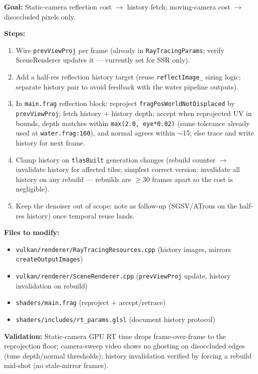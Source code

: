 \documentclass[11pt,a4paper]{article}
\begin{document}
\begin{tcolorbox}[promptbox={Prompt: Temporal Reflection Reuse with Disocclusion Retrace}]
\textbf{Goal:} Static-camera reflection cost $\rightarrow$ history fetch; moving-camera cost $\rightarrow$ disoccluded pixels only.

\textbf{Steps:}
\begin{enumerate}
    \item Wire \texttt{prevViewProj} per frame (already in \texttt{RayTracingParams}; verify SceneRenderer updates it --- currently set for SSR only).
    \item Add a half-res reflection history target (reuse \texttt{reflectImage\_} sizing logic; separate history pair to avoid feedback with the water pipeline outputs).
    \item In \texttt{main.frag} reflection block: reproject \texttt{fragPosWorldNotDisplaced} by \texttt{prevViewProj}; fetch history + history depth; accept when reprojected UV in bounds, depth matches within \texttt{max(2.0, eye*0.02)} (same tolerance already used at \texttt{water.frag:160}), and normal agrees within $\sim$15\textdegree; else trace and write history for next frame.
    \item Clamp history on \texttt{tlasBuilt} generation changes (rebuild counter $\rightarrow$ invalidate history for affected tiles; simplest correct version: invalidate all history on any rebuild --- rebuilds are $\geq$30 frames apart so the cost is negligible).
    \item Keep the denoiser out of scope: note as follow-up (SGSV/ATrous on the half-res history) once temporal reuse lands.
\end{enumerate}

\textbf{Files to modify:}
\begin{itemize}
    \item \texttt{vulkan/renderer/RayTracingResources.cpp} (history images, mirrors \texttt{createOutputImages})
    \item \texttt{vulkan/renderer/SceneRenderer.cpp} (\texttt{prevViewProj} update, history invalidation on rebuild)
    \item \texttt{shaders/main.frag} (reproject $+$ accept/retrace)
    \item \texttt{shaders/includes/rt\_params.glsl} (document history protocol)
\end{itemize}

\textbf{Validation:} Static-camera GPU RT time drops frame-over-frame to the reprojection floor; camera-sweep video shows no ghosting on disoccluded edges (tune depth/normal thresholds); history invalidation verified by forcing a rebuild mid-shot (no stale-mirror frames).
\end{tcolorbox}
\end{document}
